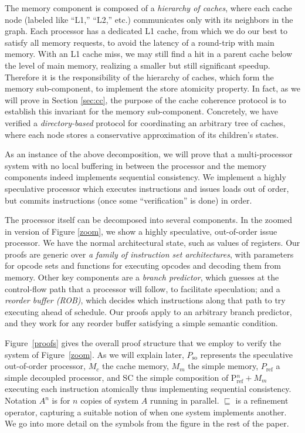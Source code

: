 The memory component is composed of a \emph{hierarchy of caches}, where each
cache node (labeled like ``L1,'' ``L2,'' etc.) communicates only with its
neighbors in the graph.  Each processor has a dedicated L1 cache, from which we
do our best to satisfy all memory requests, to avoid the latency of a
round-trip with main memory.  With an L1 cache miss, we may still find a hit in
a parent cache below the level of main memory, realizing a smaller but still
significant speedup.  Therefore it is the responsibility of the hierarchy of
caches, which form the memory sub-component, to implement the store atomicity
property. In fact, as we will prove in Section \ref{sec:cc}, the purpose of the
cache coherence protocol is to establish this invariant for the memory
sub-component.  Concretely, we have verified a \emph{directory-based} protocol
for coordinating an arbitrary tree of caches, where each node stores a
conservative approximation of its children's states.

As an instance of the above decomposition, we will prove that a multi-processor
system with no local buffering in between the processor and the memory
components indeed implements sequential consistency. We implement a highly
speculative processor which executes instructions and issues loads out of
order, but commits instructions (once some ``verification'' is done) in order.

The processor itself can be decomposed into several components. In the zoomed
in version of Figure \ref{zoom}, we show a highly speculative, out-of-order
issue processor. We have the normal architectural state, such as values of
registers.  Our proofs are generic over \emph{a family of instruction set
architectures}, with parameters for opcode sets and functions for executing
opcodes and decoding them from memory.  Other key components are a \emph{branch
predictor}, which guesses at the control-flow path that a processor will
follow, to facilitate speculation; and a \emph{reorder buffer (ROB)}, which
decides which instructions along that path to try executing ahead of schedule.
Our proofs apply to an arbitrary branch predictor, and they work for any
reorder buffer satisfying a simple semantic condition.

Figure~\ref{proofs} gives the overall proof structure that we employ to verify
the system of Figure~\ref{zoom}. As we will explain later, $P_\text{so}$
represents the speculative out-of-order processor, $M_c$ the cache memory,
$M_m$ the simple memory, $P_\text{ref}$ a simple decoupled processor, and
SC the simple composition of P$^n_\text{ref}+ M_m$ executing each
instruction atomically thus implementing sequential consistency. Notation
$A^n$ is for $n$ copies of system $A$ running in parallel.
$\sqsubseteq$ is a refinement operator, capturing a suitable notion of when
one system implements another.  We go into more detail on the symbols from
the figure in the rest of the paper.

